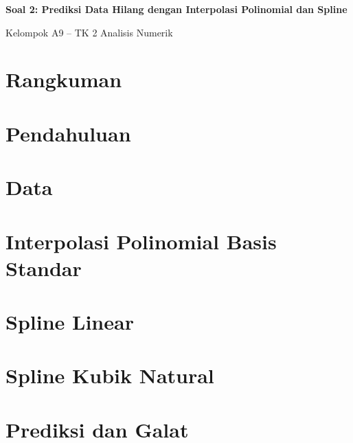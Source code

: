 \documentclass[12pt,a4paper]{article}
\begin{document}
\begin{center}
{\Large\bfseries Soal 2: Prediksi Data Hilang dengan Interpolasi Polinomial dan Spline}\par\medskip
Kelompok A9 -- TK 2 Analisis Numerik
\end{center}

\section*{Rangkuman}

\setcounter{tocdepth}{1}
\tableofcontents
\clearpage

\section{Pendahuluan}

\section{Data}\label{sec:data}

\section{Interpolasi Polinomial Basis Standar}\label{sec:poly}

\section{Spline Linear}\label{sec:linspline}

\section{Spline Kubik Natural}\label{sec:cubspline}

\section{Prediksi dan Galat}\label{sec:galat}
\end{document}
